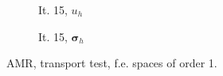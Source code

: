 \documentclass[a4paper,12pt]{amsart}
\numberwithin{equation}{section}
\def\bsigma{{\boldsymbol \sigma}}
\begin{document}
\begin{figure}[h!]
\begin{subfigure}[t]{0.35\textwidth}
	\caption{It. 15, $u_h$}
\end{subfigure}
	\hfill
\begin{subfigure}[t]{0.35\textwidth}
	\caption{It. 15, $\bsigma_h$}
\end{subfigure}

\caption{AMR, transport test, f.e. spaces of order 1.}
\label{fig:amr_transp_feorder1}
\end{figure}
\end{document}
